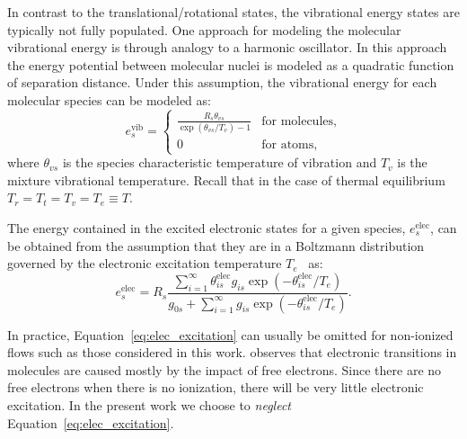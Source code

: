 \documentclass[10pt]{article}
\begin{document}
In contrast to the translational/rotational states, the vibrational energy states are typically not fully populated. One approach for modeling the molecular vibrational energy is through analogy to a harmonic oscillator.  In this approach the energy potential between molecular nuclei is modeled as a quadratic function of separation distance.  Under this assumption, the vibrational energy for each molecular species can be modeled as:
\begin{equation*}
  \label{eq:species_vibrational_energy}
  e^{\text{vib}}_s = 
  \begin{cases}    
    \frac{R_s\theta_{vs}}{\exp\left(\theta_{vs}/T_v\right) - 1} & \text{for molecules}, \\
    0 & \text{for atoms},
  \end{cases}
\end{equation*}
where $\theta_{vs}$ is the species characteristic temperature of vibration and $T_v$ is the mixture vibrational temperature.
Recall that in the case of thermal equilibrium $T_r=T_t=T_v=T_e\equiv T$.%

The energy contained in the excited electronic states for a given species, $e^{\text{elec}}_s$, can be obtained from the assumption that they are in a Boltzmann distribution governed by the electronic excitation temperature $T_e$~\citep{candler_thesis} as:
\begin{equation}
  \label{eq:elec_excitation}
  e^{\text{elec}}_s = R_s \frac{\sum_{i=1}^\infty \theta^{\text{elec}}_{is} g_{is} \exp\left(-\theta^{\text{elec}}_{is}/T_e\right)}{g_{0s} + \sum_{i=1}^\infty g_{is} \exp\left(-\theta^{\text{elec}}_{is}/T_e\right)}.
\end{equation}

In practice, Equation~\eqref{eq:elec_excitation} can usually be omitted for non-ionized flows such as those considered in this work. \citet{park_book} observes that electronic transitions in molecules are caused mostly by the impact of free electrons.  Since there are no free electrons when there is no ionization, there will be very little electronic excitation.  In the present work we choose to \textit{neglect} Equation~\eqref{eq:elec_excitation}.
\end{document}
